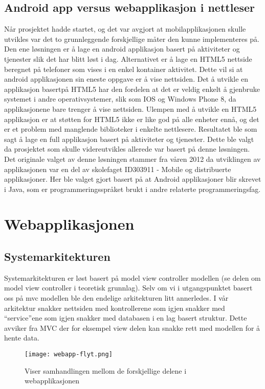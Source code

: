 \documentclass[../main.tex]{subfiles}
\begin{document}
\subsection{Android app versus webapplikasjon i nettleser}
Når prosjektet hadde startet, og det var avgjort at mobilapplikasjonen skulle utvikles var det to grunnleggende forskjellige måter den kunne implementeres på. Den ene løsningen er å lage en android applikasjon basert på aktiviteter og tjenester slik det har blitt løst i dag. Alternativet er å lage en HTML5 nettside beregnet på telefoner som vises i en enkel kontainer aktivitet. Dette vil si at android applikasjonen sin eneste oppgave er å vise nettsiden.\newline
Det å utvikle en applikasjon basertpå HTML5 har den fordelen at det er veldig enkelt å gjenbruke systemet i andre operativsystemer, slik som IOS og Windows Phone 8, da applikasjonene bare trenger å vise nettsiden. Ulempen med å utvikle en HTML5 applikasjon er at støtten for HTML5 ikke er like god på alle enheter ennå, og det er et problem med manglende biblioteker i enkelte nettlesere.\newline
Resultatet ble som sagt å lage en full applikasjon basert på aktiviteter og tjenester. Dette ble valgt da prosjektet som skulle videreutvikles allerede var basert på denne løsningen. Det originale valget av denne løsningen stammer fra våren 2012 da utviklingen av applikasjonen var en del av skolefaget ID303911 - Mobile og distribuerte applikasjoner. Her ble valget gjort basert på at Android applikasjoner blir skrevet i Java, som er programmeringsspråket brukt i andre relaterte programmeringsfag.

\section{Webapplikasjonen}

\subsection{Systemarkitekturen}
Systemarkitekturen er løst basert på model view controller modellen (se delen om model view controller i teoretisk grunnlag). Selv om vi i utgangspunktet basert oss på mvc modellen ble den endelige arkitekturen litt annerledes. I vår arkitektur snakker nettsiden med kontrollerene som igjen snakker med “service”ene som igjen snakker med databasen i en lag basert struktur. Dette avviker fra MVC der for eksempel view delen kan snakke rett med modellen for å hente data.
\begin{figure}[H]
  \centering
  \texttt{[image: webapp-flyt.png]}
  \caption{Viser samhandlingen mellom de forskjellige delene i webapplikasjonen}
\end{figure}
\end{document}
